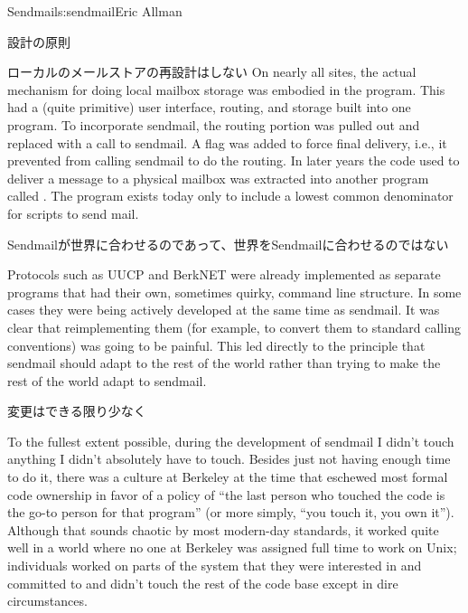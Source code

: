 \begin{aosachapter}{Sendmail}{s:sendmail}{Eric Allman}
\begin{aosasect1}{設計の原則}
\begin{aosasect2}{ローカルのメールストアの再設計はしない}
On nearly all sites, the actual mechanism for doing local mailbox
storage was embodied in the  program. This had a
(quite primitive) user interface, routing, and storage built into one
program. To incorporate sendmail, the routing portion was pulled out
and replaced with a call to sendmail.  A  flag was added to
force final delivery, i.e., it prevented  from calling
sendmail to do the routing. In later years the code used to deliver a
message to a physical mailbox was extracted into another program
called . The  program exists today
only to include a lowest common denominator for scripts to send
mail.

\end{aosasect2}

\begin{aosasect2}{Sendmailが世界に合わせるのであって、世界をSendmailに合わせるのではない}

Protocols such as UUCP and BerkNET were already implemented as
separate programs that had their own, sometimes quirky, command line
structure. In some cases they were being actively developed at the
same time as sendmail. It was clear that reimplementing them (for
example, to convert them to standard calling conventions) was going to
be painful. This led directly to the principle that sendmail should
adapt to the rest of the world rather than trying to make the rest of
the world adapt to sendmail.

\end{aosasect2}

\begin{aosasect2}{変更はできる限り少なく}

To the fullest extent possible, during the development of sendmail I
didn't touch anything I didn't absolutely have to touch. Besides just
not having enough time to do it, there was a culture at Berkeley at
the time that eschewed most formal code ownership in favor of a policy
of ``the last person who touched the code is the go-to person for that
program'' (or more simply, ``you touch it, you own it''). Although
that sounds chaotic by most modern-day standards, it worked quite well
in a world where no one at Berkeley was assigned full time to work on
Unix; individuals worked on parts of the system that they were
interested in and committed to and didn't touch the rest of the code
base except in dire circumstances.


\end{aosasect2}
\end{aosasect1}
\end{aosachapter}
